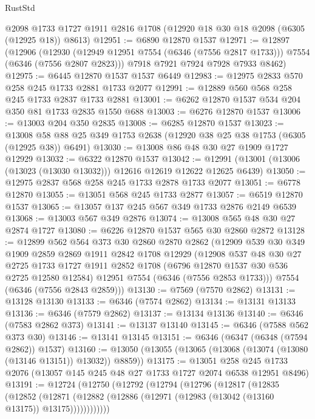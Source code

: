 \begin{lexlean}{RustStd}
\begin{coremodule}
    @2098
    @1733
    @1727
    @1911
    @2816
    @1708
    (@12920 @18 @30 @18 @2098 (@6305 (@12925 @18)) @8613)
@12951 := @6890 @12870 @1537
@12971 := @12897
    (@12906
      (@12930 (@12949 @12951 @7554 (@6346 (@7556 @2817 @1733))) @7554 (@6346 (@7556 @2807 @2823)))
      @7918
      @7921
      @7924
      @7928
      @7933
      @8462)
@12975 := @6445 @12870 @1537 @1537 @6449
@12983 := @12975 @2833 @570 @258 @245 @1733 @2881 @1733 @2077
@12991 := @12889 @560 @568 @258 @245 @1733 @2837 @1733 @2881
@13001 := @6262 @12870 @1537 @534 @204 @350 @81 @1733 @2835 @1550 @688
@13003 := @6276 @12870 @1537
@13006 := @13003 @204 @350 @2835
@13008 := @6285 @12870 @1537
@13023 := @13008 @58 @88 @25 @349 @1753 @2638 (@12920 @38 @25 @38 @1753 (@6305 (@12925 @38)) @6491)
@13030 := @13008 @86 @48 @30 @27 @1909 @1727 @12929
@13032 := @6322 @12870 @1537
@13042 := @12991 (@13001 (@13006 (@13023 (@13030 @13032))) @12616 @12619 @12622 @12625 @6439)
@13050 := @12975 @2837 @568 @258 @245 @1733 @2878 @1733 @2077
@13051 := @6778 @12870
@13055 := @13051 @568 @245 @1733 @2877
@13057 := @6519 @12870 @1537
@13065 := @13057 @137 @245 @567 @349 @1733 @2876 @2149 @6539
@13068 := @13003 @567 @349 @2876
@13074 := @13008 @565 @48 @30 @27 @2874 @1727
@13080 := @6226 @12870 @1537 @565 @30 @2860 @2872
@13128 := @12899
    @562
    @564
    @373
    @30
    @2860
    @2870
    @2862
    (@12909
      @539
      @30
      @349
      @1909
      @2859
      @2869
      @1911
      @2842
      @1708
      @12929
      (@12908
        @537
        @48
        @30
        @27
        @2725
        @1733
        @1727
        @1911
        @2852
        @1708
        (@6796 @12870 @1537 @30 @536 @2725 @12580 @12584)
        @12951
        @7554
        (@6346 (@7556 @2853 @1733)))
      @7554
      (@6346 (@7556 @2843 @2859)))
@13130 := @7569 (@7570 @2862)
@13131 := @13128 @13130
@13133 := @6346 (@7574 @2862)
@13134 := @13131 @13133
@13136 := @6346 (@7579 @2862)
@13137 := @13134 @13136
@13140 := @6346 (@7583 @2862 @373)
@13141 := @13137 @13140
@13145 := @6346 (@7588 @562 @373 @30)
@13146 := @13141 @13145
@13151 := @6346 (@6347 (@6348 (@7594 @2862)) @1537)
@13160 := @13050 (@13055 (@13065 (@13068 (@13074 (@13080 (@13146 @13151)) @13032)) @8859))
@13175 := @13051
    @258
    @245
    @1733
    @2076
    (@13057 @145 @245 @48 @27 @1733 @1727 @2074 @6538 @12951 @8496)
@13191 := @12724
    (@12750
      (@12792
        (@12794
          (@12796
            (@12817
              (@12835
                (@12852
                  (@12871
                    (@12882 (@12886 (@12971 (@12983 (@13042 (@13160 @13175)) @13175))))))))))))

\end{coremodule}
\end{lexlean}
